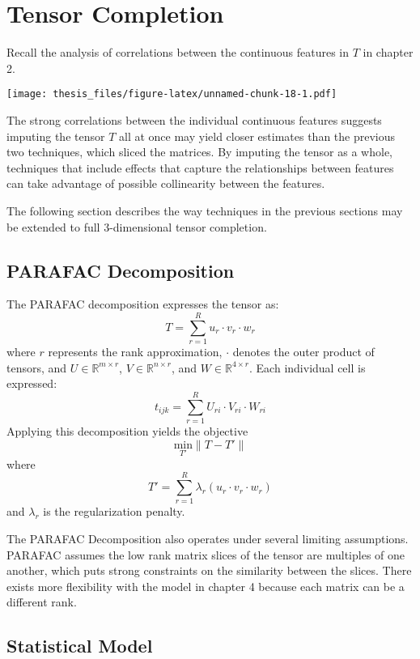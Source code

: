 \documentclass[12pt,twoside]{dukestatscithesis}
\theoremstyle{definition}
\theoremstyle{definition}
\theoremstyle{definition}
\theoremstyle{remark}
\begin{document}
\chapter{Tensor Completion}\label{tensor-completion}

Recall the analysis of correlations between the continuous features in
\(T\) in chapter 2.

\texttt{[image: thesis\_files/figure-latex/unnamed-chunk-18-1.pdf]}

The strong correlations between the individual continuous features
suggests imputing the tensor \(T\) all at once may yield closer
estimates than the previous two techniques, which sliced the matrices.
By imputing the tensor as a whole, techniques that include effects that
capture the relationships between features can take advantage of
possible collinearity between the features.

The following section describes the way techniques in the previous
sections may be extended to full 3-dimensional tensor completion.

\section{PARAFAC Decomposition}\label{parafac-decomposition}

The PARAFAC decomposition expresses the tensor as:
\[T = \sum_{r=1}^Ru_r \cdotp v_r \cdotp w_r\] where \(r\) represents the
rank approximation, \(\cdotp\) denotes the outer product of tensors, and
\(U \in \mathbb{R}^{m \times r}\), \(V \in \mathbb{R}^{n \times r}\),
and \(W \in \mathbb{R}^{4 \times r}\). Each individual cell is
expressed: \[t_{ijk} = \sum_{r=1}^RU_{ri} \cdotp V_{ri} \cdotp W_{ri}\]
Applying this decomposition yields the objective
\[\underset{T'} {\text{min}}\|T-T'\|\] where
\[T' = \sum_{r=1}^R\lambda_r(u_r \cdotp v_r \cdotp w_r)\] and
\(\lambda_r\) is the regularization penalty.

The PARAFAC Decomposition also operates under several limiting
assumptions. PARAFAC assumes the low rank matrix slices of the tensor
are multiples of one another, which puts strong constraints on the
similarity between the slices. There exists more flexibility with the
model in chapter 4 because each matrix can be a different rank.

\section{Statistical Model}\label{statistical-model}
\end{document}
